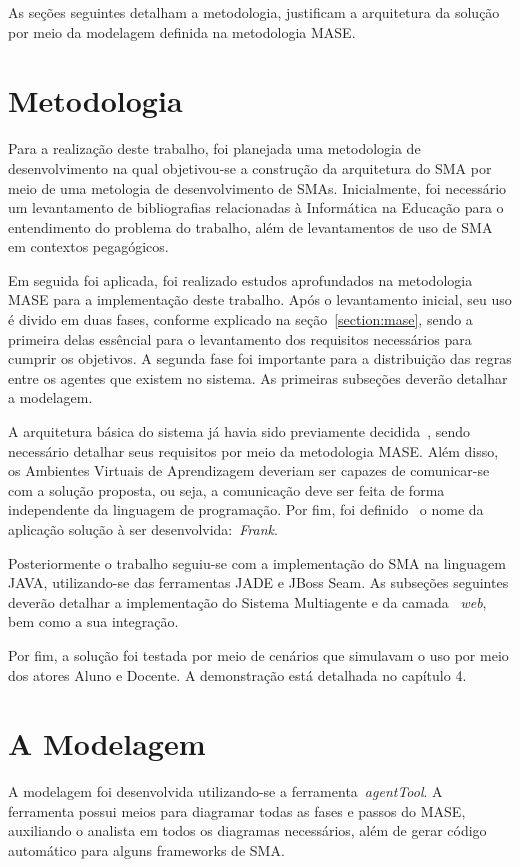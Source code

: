 As seções seguintes detalham a metodologia, justificam a arquitetura da solução por meio da modelagem definida na metodologia MASE.

\section{Metodologia}
Para a realização deste trabalho, foi planejada uma metodologia de desenvolvimento na qual objetivou-se a construção da arquitetura do SMA por meio de uma metologia de desenvolvimento de SMAs. Inicialmente, foi necessário um levantamento de bibliografias relacionadas à Informática na Educação para o entendimento do problema do trabalho, além de levantamentos de uso de SMA em contextos pegagógicos.

Em seguida foi aplicada, foi realizado estudos aprofundados na metodologia MASE para a implementação deste trabalho. Após o levantamento inicial, seu uso é divido em duas fases, conforme explicado na seção~\ref{section:mase}, sendo a primeira delas essêncial para o levantamento dos requisitos necessários para cumprir os objetivos. A segunda fase foi importante para a distribuição das regras entre os agentes que existem no sistema. As primeiras subseções deverão detalhar a modelagem.

A arquitetura básica do sistema já havia sido previamente decidida~\cite{editalFrank}, sendo necessário detalhar seus requisitos por meio da metodologia MASE. Além disso, os Ambientes Virtuais de Aprendizagem deveriam ser capazes de comunicar-se com a solução proposta, ou seja, a comunicação deve ser feita de forma independente da linguagem de programação. Por fim, foi definido~\cite{editalFrank} o nome da aplicação solução à ser desenvolvida:~\emph{Frank}.

Posteriormente o trabalho seguiu-se com a implementação do SMA na linguagem JAVA, utilizando-se das ferramentas JADE e JBoss Seam. As subseções seguintes deverão detalhar a implementação do Sistema Multiagente e da camada ~\emph{web}, bem como a sua integração.

Por fim, a solução foi testada por meio de cenários que simulavam o uso por meio dos atores Aluno e Docente. A demonstração está detalhada no capítulo 4.

\section{A Modelagem}

A modelagem foi desenvolvida utilizando-se a ferramenta~\emph{agentTool}. A ferramenta possui meios para diagramar todas as fases e passos do MASE, auxiliando o analista em todos os diagramas necessários, além de gerar código automático para alguns frameworks de SMA.

